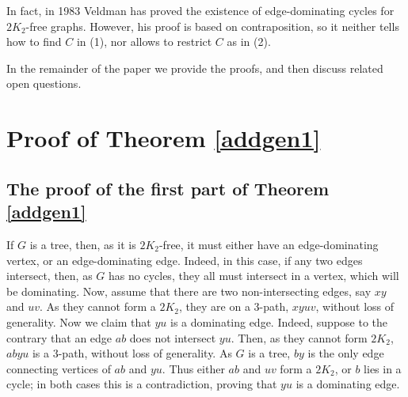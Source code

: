 \documentclass[runningheads,a4paper]{llncs}
\begin{document}
In fact, in 1983 Veldman \cite{veldman83} has proved the existence of
edge-dominating cycles for $2K_2$-free graphs. However, his proof is based on
contraposition, so it neither tells how to find $C$ in (1), nor
allows to restrict $C$ as in (2).

In the remainder of the paper we provide the proofs, and then discuss related 
open questions.


\section{Proof of Theorem \ref{addgen1}}

\subsection{The proof of the first part of Theorem \ref{addgen1}}
If $G$ is a tree, then, as it is $2K_2$-free, it must either have an edge-dominating
vertex, or an edge-dominating edge.
Indeed, in this case, if any two edges intersect, then, as $G$ has no cycles, 
they all must intersect in a vertex, which will be dominating. Now, assume that there are
two non-intersecting edges, say $xy$ and $uv$. As they cannot form a $2K_2$, they are on
a 3-path, $xyuv$, without loss of generality. Now we claim that $yu$ is a dominating edge.
Indeed, suppose to the contrary that an edge $ab$ does not intersect $yu$. Then, as they
cannot form $2K_2$, $abyu$ is a 3-path, without loss of generality. As $G$ is a tree, $by$
is the only edge connecting vertices of $ab$ and $yu$. Thus either
$ab$ and $uv$ form a $2K_2$, or $b$ lies in a cycle; in both cases this is a contradiction,
proving that $yu$ is a dominating edge.
\end{document}
